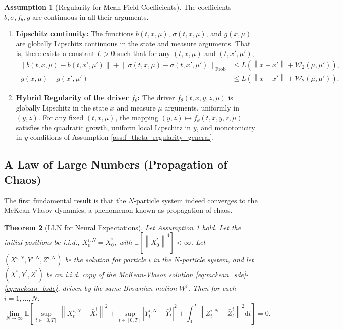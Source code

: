 \documentclass[qian]{imsart}
\newcommand{\E}{\mathbb{E}}
\newcommand{\dd}{\mathrm{d}}
\newcommand{\norm}[1]{\left\lVert#1\right\rVert}
\newcommand{\abs}[1]{\left\lvert#1\right\rvert}
\newcommand{\wass}{\mathcal{W}_2}
\theoremstyle{plain}
\newtheorem{theorem}{Theorem}[section]
\theoremstyle{definition}
\newtheorem{assumption}[theorem]{Assumption}
\begin{document}
\begin{assumption}[Regularity for Mean-Field Coefficients] \label{ass:mckean_regularity}
The coefficients $b, \sigma, f_\theta, g$ are continuous in all their arguments.
\begin{enumerate}[label=(\roman*)]
    \item \textbf{Lipschitz continuity:} The functions $b(t,x,\mu)$, $\sigma(t,x,\mu)$, and $g(x,\mu)$ are globally Lipschitz continuous in the state and measure arguments. That is, there exists a constant $L>0$ such that for any $(t,x,\mu)$ and $(t,x',\mu')$,
    \begin{align*}
        \norm{b(t,x,\mu) - b(t,x',\mu')} + \norm{\sigma(t,x,\mu) - \sigma(t,x',\mu')}_{\mathrm{Frob}} &\le L(\norm{x-x'} + \wass(\mu,\mu')), \\
        \abs{g(x,\mu) - g(x',\mu')} &\le L(\norm{x-x'} + \wass(\mu,\mu')).
    \end{align*}
    \item \textbf{Hybrid Regularity of the driver $f_\theta$:} The driver $f_\theta(t,x,y,z,\mu)$ is globally Lipschitz in the state $x$ and measure $\mu$ arguments, uniformly in $(y,z)$. For any fixed $(t,x,\mu)$, the mapping $(y,z) \mapsto f_\theta(t,x,y,z,\mu)$ satisfies the quadratic growth, uniform local Lipschitz in $y$, and monotonicity in $y$ conditions of Assumption \ref{ass:f_theta_regularity_general}.
\end{enumerate}
\end{assumption}

\subsection{A Law of Large Numbers (Propagation of Chaos)}

The first fundamental result is that the $N$-particle system indeed converges to the McKean-Vlasov dynamics, a phenomenon known as propagation of chaos.

\begin{theorem}[LLN for Neural Expectations] \label{thm:lln_mckean_vlasov}
Let Assumption \ref{ass:mckean_regularity} hold. Let the initial positions be i.i.d., $X^{i,N}_0 = \bar{X}^i_0$, with $\E[\norm{\bar{X}^i_0}^4] < \infty$. Let $(X^{i,N}, Y^{i,N}, Z^{i,N})$ be the solution for particle $i$ in the $N$-particle system, and let $(\bar{X}^i, \bar{Y}^i, \bar{Z}^i)$ be an i.i.d. copy of the McKean-Vlasov solution \eqref{eq:mckean_sde}-\eqref{eq:mckean_bsde}, driven by the same Brownian motion $W^i$. Then for each $i=1,\dots,N$:
\[ \lim_{N \to \infty} \E\left[ \sup_{t \in [0,T]} \norm{X^{i,N}_t - \bar{X}^i_t}^2 + \sup_{t \in [0,T]} \abs{Y^{i,N}_t - \bar{Y}^i_t}^2 + \int_0^T \norm{Z^{i,N}_t - \bar{Z}^i_t}^2 \dd t \right] = 0. \]
\end{theorem}
\end{document}
